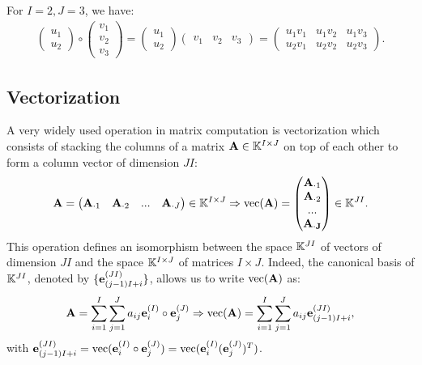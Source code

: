 \begin{example}{}{}
    For $I=2,J=3$, we have:
    \begin{align*}
        \begin{pmatrix}
            u_1\\ u_{2}
        \end{pmatrix}\circ
        \begin{pmatrix}
            v_1\\ v_{2} \\v_{3}
        \end{pmatrix}
        = \begin{pmatrix}
            u_1\\ u_{2}
        \end{pmatrix} 
        \begin{pmatrix}
            v_1& v_{2} &v_{3}
        \end{pmatrix}
        = \begin{pmatrix}
            u_1v_1& u_1v_{2} & u_1v_{3}\\
            u_2v_1& u_2v_2 & u_2v_3
        \end{pmatrix}.
    \end{align*}
\end{example}

\subsection{Vectorization}
A very widely used operation in matrix computation is vectorization
which consists of stacking the columns of a matrix $\bold{A}\in \mathbb{K}^{I\times J}$
on top of each other to form a column vector of dimension $JI$:
\begin{align*}
    \bold{A}=\begin{pmatrix}
        \bold{A}_{\cdot 1}& \bold{A}_{\cdot 2} & ... & \bold{A}_{\cdot J}
    \end{pmatrix}\in \mathbb{K}^{I\times J}
    \Rightarrow \text{vec}(\bold{A}) = \begin{pmatrix}
        \bold{A}_{\cdot 1} \\ \bold{A}_{\cdot 2}\\ ...\\ \bold{A_{\cdot J}}
    \end{pmatrix}\in \mathbb{K}^{JI}.
\end{align*}
This operation defines an isomorphism between the space $\mathbb{K}^{JI}$ of vectors
of dimension $JI$ and the space $\mathbb{K}^{I\times J}$ of matrices $I\times J$.
Indeed, the canonical basis of $\mathbb{K}^{JI}$, denoted by $\{\bold{e}_{(j-1)I+i}^{(JI)}\}$, 
allows us to write $\text{vec}(\bold{A})$ as:
\begin{align*}
    \bold{A}=\sum\limits_{i=1}^{I}\sum\limits_{j=1}^{J}a_{ij}\bold{e}_i^{(I)}\circ \bold{e}_j^{(J)}
    \Rightarrow
    \text{vec}(\bold{A})=\sum\limits_{i=1}^{I}\sum\limits_{j=1}^{J}a_{ij}\bold{e}_{(j-1)I+i}^{(JI)},
\end{align*}
with $\bold{e}_{(j-1)I+i}^{(JI)}=\text{vec}(\bold{e}_i^{(I)}\circ \bold{e}_j^{(J)})=\text{vec}(\bold{e}_i^{(I)}(\bold{e}_j^{(J)})^T)$.

